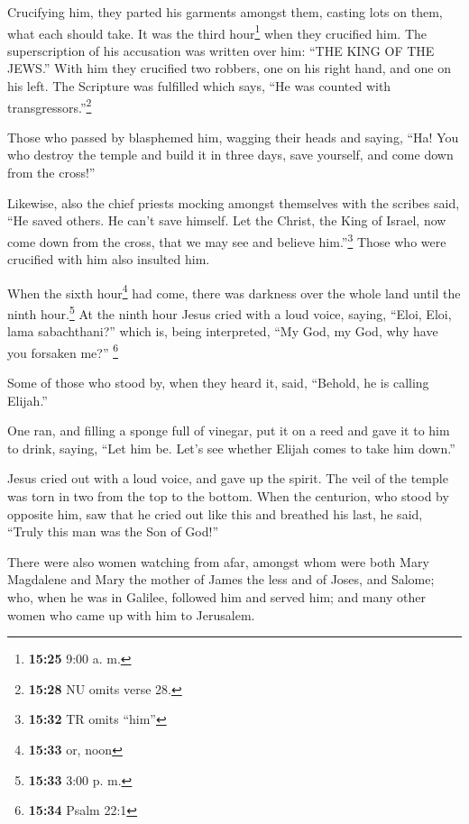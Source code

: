  Crucifying him, they parted his garments amongst them,
casting lots on them, what each should take.  It was the
third hour\footnote{\textbf{15:25} 9:00 a. m.} when they crucified him.
 The superscription of his accusation was written over
him: ``THE KING OF THE JEWS.''  With him they crucified
two robbers, one on his right hand, and one on his left. 
The Scripture was fulfilled which says, ``He was counted with
transgressors.''\footnote{\textbf{15:28} NU omits verse 28.}

 Those who passed by blasphemed him, wagging their heads
and saying, ``Ha! You who destroy the temple and build it in three days,
 save yourself, and come down from the cross!''

 Likewise, also the chief priests mocking amongst
themselves with the scribes said, ``He saved others. He can't save
himself.  Let the Christ, the King of Israel, now come
down from the cross, that we may see and believe him.''\footnote{\textbf{15:32}
  TR omits ``him''} Those who were crucified with him also insulted him.

 When the sixth hour\footnote{\textbf{15:33} or, noon}
had come, there was darkness over the whole land until the ninth
hour.\footnote{\textbf{15:33} 3:00 p. m.}  At the ninth
hour Jesus cried with a loud voice, saying, ``Eloi, Eloi, lama
sabachthani?'' which is, being interpreted, ``My God, my God, why have
you forsaken me?'' \footnote{\textbf{15:34} Psalm 22:1}

 Some of those who stood by, when they heard it, said,
``Behold, he is calling Elijah.''

 One ran, and filling a sponge full of vinegar, put it on
a reed and gave it to him to drink, saying, ``Let him be. Let's see
whether Elijah comes to take him down.''

 Jesus cried out with a loud voice, and gave up the
spirit.  The veil of the temple was torn in two from the
top to the bottom.  When the centurion, who stood by
opposite him, saw that he cried out like this and breathed his last, he
said, ``Truly this man was the Son of God!''

 There were also women watching from afar, amongst whom
were both Mary Magdalene and Mary the mother of James the less and of
Joses, and Salome;  who, when he was in Galilee, followed
him and served him; and many other women who came up with him to
Jerusalem.

